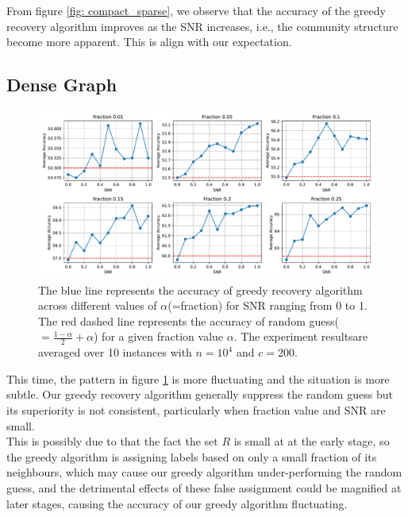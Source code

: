 From figure \ref{fig: compact_sparse}, we observe that the accuracy of the greedy recovery algorithm improves as the SNR increases, i.e., the community structure become more apparent. This is align with our expectation.
\subsection{Dense Graph}
\begin{figure}[H]
    \centering
    \includegraphics[width=1\linewidth]{Figures/Greedy_Recovery_super_dense_3.pdf}
    \caption[Accuracy of greedy recovery algorithm for dense graph]{The blue line represents the accuracy of greedy recovery algorithm across different values of $\alpha$(=fraction) for SNR ranging from 0 to 1. The red dashed line represents the accuracy of random guess($=\frac{1-\alpha}{2}+\alpha$) for a given fraction value $\alpha$. The experiment results\protect\footnotemark are averaged over 10 instances with $n=10^4$ and $c=200.$}
    \label{fig:greedy_dense}
\end{figure}
This time, the pattern in figure \ref{fig:greedy_dense} is more fluctuating and the situation is more subtle. Our greedy recovery algorithm generally suppress the random guess but its superiority is not consistent, particularly when fraction value and SNR are small.\\
This is possibly due to that the fact the set $R$ is small at at the early stage, so the greedy algorithm is assigning labels based on only a small fraction of its neighbours, which may cause our greedy algorithm under-performing the random guess, and the detrimental effects of these false assignment could be magnified at later stages, causing the accuracy of our greedy algorithm fluctuating.
\clearpage
